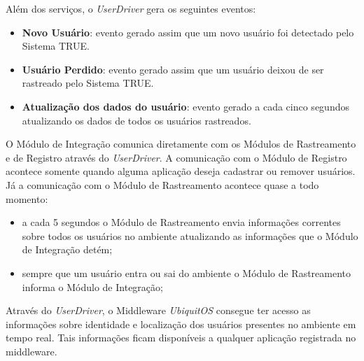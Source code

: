 Além dos serviços, o \textit{UserDriver} gera os seguintes eventos:

	\begin{itemize}
		\item \textbf{Novo Usuário}: evento gerado assim que um novo usuário foi detectado pelo Sistema TRUE.
		\item \textbf{Usuário Perdido}: evento gerado assim que um usuário deixou de ser rastreado pelo Sistema TRUE.
		\item \textbf{Atualização dos dados do usuário}: evento gerado a cada cinco segundos atualizando os dados de todos os usuários rastreados.
	\end{itemize}

O Módulo de Integração comunica diretamente com os Módulos de Rastreamento e de Registro através do \textit{UserDriver}. A comunicação com o Módulo de Registro acontece somente quando alguma aplicação deseja cadastrar ou remover usuários. Já a comunicação com o Módulo de Rastreamento acontece quase a todo momento: 

	\begin{itemize}
		\item a cada 5 segundos o Módulo de Rastreamento envia informações correntes sobre todos os usuários no ambiente atualizando as informações que o Módulo de Integração detém;
		\item sempre que um usuário entra ou sai do ambiente o Módulo de Rastreamento informa o Módulo de Integração;
	\end{itemize} 

Através do \textit{UserDriver}, o Middleware \textit{UbiquitOS} consegue ter acesso as informações sobre identidade e localização dos usuários presentes no ambiente em tempo real. Tais informações ficam disponíveis a qualquer aplicação registrada no middleware. 
